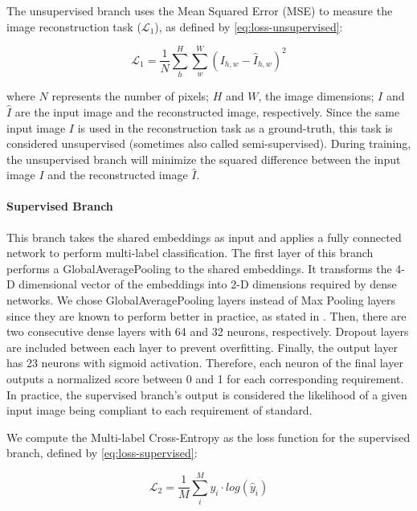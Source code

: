 The unsupervised branch uses the Mean Squared Error (MSE) to measure the image reconstruction task ($\mathcal{L}_1$), as defined by \autoref{eq:loss-unsupervised}:

\begin{equation}
\label{eq:loss-unsupervised}
\mathcal{L}_1 = \frac{1}{N} \sum_h^H \sum_w^W ({I_{h,w} - \hat{I}_{h,w}})^2
\end{equation}

\noindent where $N$ represents the number of pixels; $H$ and $W$, the image dimensions; $I$ and $\hat{I}$ are the input image and the reconstructed image, respectively. Since the same input image $I$ is used in the reconstruction task as a ground-truth, this task is considered unsupervised (sometimes also called semi-supervised). During training, the unsupervised branch will minimize the squared difference between the input image $I$ and the reconstructed image $\hat{I}$.

\paragraph{Supervised Branch}

This branch takes the shared embeddings as input and applies a fully connected network to perform multi-label classification. The first layer of this branch performs a GlobalAveragePooling to the shared embeddings. It transforms the 4-D dimensional vector of the embeddings into 2-D dimensions required by dense networks. We chose GlobalAveragePooling layers instead of Max Pooling layers since they are known to perform better in practice, as stated in \cite{zhou2016learning}. Then, there are two consecutive dense layers with 64 and 32 neurons, respectively. Dropout layers are included between each layer to prevent overfitting. Finally, the output layer has 23 neurons with sigmoid activation. Therefore, each neuron of the final layer outputs a normalized score between 0 and 1 for each corresponding requirement. In practice, the supervised branch's output is considered the likelihood of a given input image being compliant to each requirement of \icao standard.

We compute the Multi-label Cross-Entropy as the loss function for the supervised branch, defined by \autoref{eq:loss-supervised}:

\begin{equation}
\label{eq:loss-supervised}
\mathcal{L}_2 = \frac{1}{M} \sum_i^M {y_i \cdot log(\hat{y}_i)}
\end{equation}

